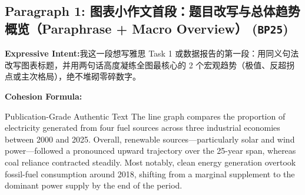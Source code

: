 \subsection*{Paragraph 1: 图表小作文首段：题目改写与总体趋势概览（Paraphrase + Macro Overview） (\texttt{BP25})}
\noindent\textbf{Expressive Intent:}\enspace 我这一段想写雅思 Task 1 或数据报告的第一段：用同义句法改写图表标题，并用两句话高度凝练全图最核心的 2 个宏观趋势（极值、反超拐点或主次格局），绝不堆砌零碎数字。\par
\noindent\textbf{Cohesion Formula:}\par\vspace{4pt}
\begin{ExampleBox}{Publication-Grade Authentic Text}
The line graph compares the proportion of electricity generated from four fuel sources across three industrial economies between 2000 and 2025. Overall, renewable sources---particularly solar and wind power---followed a pronounced upward trajectory over the 25-year span, whereas coal reliance contracted steadily. Most notably, clean energy generation overtook fossil-fuel consumption around 2018, shifting from a marginal supplement to the dominant power supply by the end of the period.
\end{ExampleBox}
